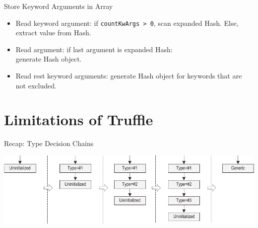 \documentclass[xcolor=dvipsname,handout]{beamer} %
\begin{document}
%

\begin{frame}{Store Keyword Arguments in Array}
\begin{itemize}
    \item Read keyword argument: if \lstinline{countKwArgs > 0}, scan expanded Hash. Else, extract value from Hash.
    \item Read argument: if last argument is expanded Hash: \\ generate Hash object.
    \item Read rest keyword arguments: generate Hash object for keywords that are not excluded.
\end{itemize}
\end{frame}

\section{Limitations of Truffle}
\begin{frame}{Recap: Type Decision Chains}
\begin{table}
    \includegraphics[width=\textwidth]{type_chain.pdf}
\end{table}
\end{frame}
\end{document}
